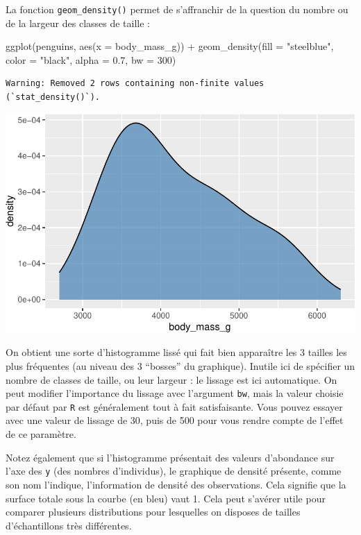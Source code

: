 \documentclass[
  a4paper,
  DIV=11,
  numbers=noendperiod,
  oneside]{scrreprt}
\newenvironment{Shaded}{}{}
\newcommand{\AttributeTok}[1]{\textcolor[rgb]{0.84,0.23,0.29}{#1}}
\newcommand{\DecValTok}[1]{\textcolor[rgb]{0.00,0.36,0.77}{#1}}
\newcommand{\FloatTok}[1]{\textcolor[rgb]{0.00,0.36,0.77}{#1}}
\newcommand{\FunctionTok}[1]{\textcolor[rgb]{0.44,0.26,0.76}{#1}}
\newcommand{\NormalTok}[1]{\textcolor[rgb]{0.14,0.16,0.18}{#1}}
\newcommand{\SpecialCharTok}[1]{\textcolor[rgb]{0.00,0.36,0.77}{#1}}
\newcommand{\StringTok}[1]{\textcolor[rgb]{0.01,0.18,0.38}{#1}}
\begin{document}
La fonction \texttt{geom\_density()} permet de s'affranchir de la
question du nombre ou de la largeur des classes de taille :

\begin{Shaded}
\begin{Highlighting}[]
\FunctionTok{ggplot}\NormalTok{(penguins, }\FunctionTok{aes}\NormalTok{(}\AttributeTok{x =}\NormalTok{ body\_mass\_g)) }\SpecialCharTok{+}
  \FunctionTok{geom\_density}\NormalTok{(}\AttributeTok{fill =} \StringTok{"steelblue"}\NormalTok{, }\AttributeTok{color =} \StringTok{"black"}\NormalTok{, }\AttributeTok{alpha =} \FloatTok{0.7}\NormalTok{, }\AttributeTok{bw =} \DecValTok{300}\NormalTok{)}
\end{Highlighting}
\end{Shaded}

\begin{verbatim}
Warning: Removed 2 rows containing non-finite values (`stat_density()`).
\end{verbatim}

\includegraphics{03-visualization_files/figure-pdf/unnamed-chunk-22-1.pdf}

On obtient une sorte d'histogramme lissé qui fait bien apparaître les 3
tailles les plus fréquentes (au niveau des 3 ``bosses'' du graphique).
Inutile ici de spécifier un nombre de classes de taille, ou leur largeur
: le lissage est ici automatique. On peut modifier l'importance du
lissage avec l'argument \texttt{bw}, mais la valeur choisie par défaut
par \texttt{R} est généralement tout à fait satisfaisante. Vous pouvez
essayer avec une valeur de lissage de 30, puis de 500 pour vous rendre
compte de l'effet de ce paramètre.

Notez également que si l'histogramme présentait des valeurs d'abondance
sur l'axe des \texttt{y} (des nombres d'individus), le graphique de
densité présente, comme son nom l'indique, l'information de densité des
observations. Cela signifie que la surface totale sous la courbe (en
bleu) vaut 1. Cela peut s'avérer utile pour comparer plusieurs
distributions pour lesquelles on disposes de tailles d'échantillons très
différentes.
\end{document}
